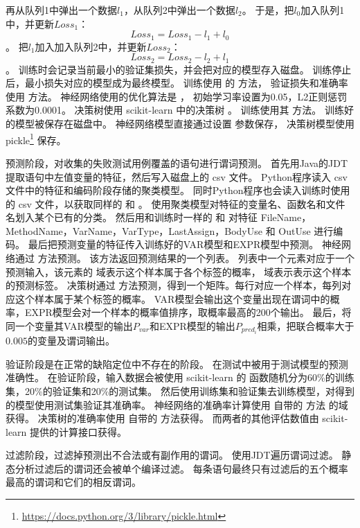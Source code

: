再从队列1中弹出一个数据$l_1$，从队列2中弹出一个数据$l_2$。
于是，把$l_0$加入队列1中，并更新$Loss_1$：
$$
Loss_1 = Loss_1 - l_1 + l_0
$$。
把$l_1$加入加入队列2中，并更新$Loss_2$：
$$
Loss_2 = Loss_2 - l_2 + l_1
$$。
训练时会记录当前最小的验证集损失，并会把对应的模型存入磁盘。
训练停止后，最小损失对应的模型成为最终模型。
训练使用  的  方法，
验证损失和准确率使用  方法。
神经网络使用的优化算法是 ，
初始学习率设置为0.05，L2正则惩罚系数为0.0001。
决策树使用 scikit-learn 中的决策树  。
训练使用其  方法。
训练好的模型被保存在磁盘中。
神经网络模型直接通过设置  参数保存，
决策树模型使用 pickle\footnote{\url{https://docs.python.org/3/library/pickle.html}} 保存。

预测阶段，对收集的失败测试用例覆盖的语句进行谓词预测。
首先用Java的JDT提取语句中左值变量的特征，然后写入磁盘上的 csv 文件。
Python程序读入 csv 文件中的特征和编码阶段存储的聚类模型。
同时Python程序也会读入训练时使用的 csv 文件，以获取同样的  和 。
使用聚类模型对特征的变量名、函数名和文件名划入某个已有的分类。
然后用和训练时一样的  和  对特征 FileName，MethodName，VarName，VarType，LastAssign，BodyUse
和 OutUse 进行编码。
最后把预测变量的特征传入训练好的VAR模型和EXPR模型中预测。
神经网络通过  方法预测。
该方法返回预测结果的一个列表。
列表中一个元素对应于一个预测输入，该元素的  域表示这个样本属于各个标签的概率，
 域表示表示这个样本的预测标签。
决策树通过  方法预测，得到一个矩阵。每行对应一个样本，每列对应这个样本属于某个标签的概率。
VAR模型会输出这个变量出现在谓词中的概率，EXPR模型会对一个样本的概率值排序，取概率最高的200个输出。
最后，将同一个变量其VAR模型的输出$P_{var}$和EXPR模型的输出$P_{pred_i}$相乘，把联合概率大于$0.005$的变量及谓词输出。

验证阶段是在正常的缺陷定位中不存在的阶段。
在测试中被用于测试模型的预测准确性。
在验证阶段，输入数据会被使用 scikit-learn 的  函数随机分为60\%的训练集，20\%的验证集和20\%的测试集。
然后使用训练集和验证集去训练模型，对得到的模型使用测试集验证其准确率。
神经网络的准确率计算使用  自带的  方法
的域  获得。
决策树的准确率使用  自带的  方法获得。
而两者的其他评估数值由 scikit-learn 提供的计算接口获得。

过滤阶段，过滤掉预测出不合法或有副作用的谓词。
使用JDT遍历谓词过滤。
静态分析过滤后的谓词还会被单个编译过滤。
每条语句最终只有过滤后的五个概率最高的谓词和它们的相反谓词。


